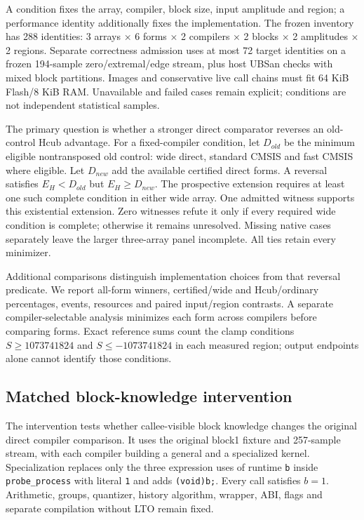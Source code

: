 \documentclass[conference]{IEEEtran}
\begin{document}
A condition fixes the array, compiler, block size, input amplitude and
region; a performance identity additionally fixes the implementation.
The frozen inventory has 288 identities: 3 arrays × 6 forms × 2
compilers × 2 blocks × 2 amplitudes × 2 regions. Separate correctness
admission uses at most 72 target identities on a frozen 194-sample
zero/extremal/edge stream, plus host UBSan checks with mixed block
partitions. Images and conservative live call chains must fit 64 KiB
Flash/8 KiB RAM. Unavailable and failed cases remain explicit;
conditions are not independent statistical samples.

The primary question is whether a stronger direct comparator reverses an
old-control Hcub advantage. For a fixed-compiler condition, let
\(D_{old}\) be the minimum eligible nontransposed old control: wide
direct, standard CMSIS and fast CMSIS where eligible. Let \(D_{new}\)
add the available certified direct forms. A reversal satisfies
\(E_H<D_{old}\) but \(E_H\ge D_{new}\). The prospective extension
requires at least one such complete condition in either wide array. One
admitted witness supports this existential extension. Zero witnesses
refute it only if every required wide condition is complete; otherwise
it remains unresolved. Missing native cases separately leave the larger
three-array panel incomplete. All ties retain every minimizer.

Additional comparisons distinguish implementation choices from that
reversal predicate. We report all-form winners, certified/wide and
Hcub/ordinary percentages, events, resources and paired input/region
contrasts. A separate compiler-selectable analysis minimizes each form
across compilers before comparing forms. Exact reference sums count the
clamp conditions \(S\ge1073741824\) and \(S\le-1073741824\) in each
measured region; output endpoints alone cannot identify those
conditions.

\subsection{Matched block-knowledge intervention}\label{matched-block-knowledge-intervention}

The intervention tests whether callee-visible block knowledge changes
the original direct compiler comparison. It uses the original block1
fixture and 257-sample stream, with each compiler building a general and
a specialized kernel. Specialization replaces only the three expression
uses of runtime \texttt{b} inside \texttt{probe\_process} with literal
\texttt{1} and adds \texttt{(void)b;}. Every call satisfies \(b=1\).
Arithmetic, groups, quantizer, history algorithm, wrapper, ABI, flags
and separate compilation without LTO remain fixed.
\end{document}
